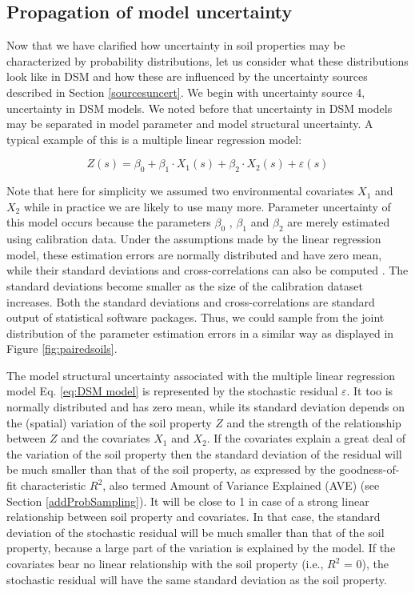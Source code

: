 \documentclass[10pt,b5paper,]{book}
\theoremstyle{definition}
\theoremstyle{definition}
\theoremstyle{definition}
\theoremstyle{remark}
\begin{document}
\hypertarget{propagation-of-model-uncertainty}{%
\subsection{Propagation of model
uncertainty}\label{propagation-of-model-uncertainty}}

Now that we have clarified how uncertainty in soil properties may be
characterized by probability distributions, let us consider what these
distributions look like in DSM and how these are influenced by the
uncertainty sources described in Section \ref{sourcesuncert}. We begin
with uncertainty source 4, uncertainty in DSM models. We noted before
that uncertainty in DSM models may be separated in model parameter and
model structural uncertainty. A typical example of this is a multiple
linear regression model:

\begin{equation}
\label{eq:DSM model}
Z(s) = \beta_0 + \beta_1  \cdot X_1 (s) + \beta_2 \cdot X_2 (s) + \varepsilon(s)
\end{equation}

Note that here for simplicity we assumed two environmental covariates
\({X_1}\) and \({X_2}\) while in practice we are likely to use many
more. Parameter uncertainty of this model occurs because the parameters
\({\beta_0}\) , \({\beta_1}\) and \({\beta_2}\) are merely estimated
using calibration data. Under the assumptions made by the linear
regression model, these estimation errors are normally distributed and
have zero mean, while their standard deviations and cross-correlations
can also be computed \citep[Section 17.5]{snedecor1989stadistical}. The
standard deviations become smaller as the size of the calibration
dataset increases. Both the standard deviations and cross-correlations
are standard output of statistical software packages. Thus, we could
sample from the joint distribution of the parameter estimation errors in
a similar way as displayed in Figure \ref{fig:pairedsoils}.

The model structural uncertainty associated with the multiple linear
regression model Eq. \ref{eq:DSM model} is represented by the stochastic
residual \({\varepsilon}\). It too is normally distributed and has zero
mean, while its standard deviation depends on the (spatial) variation of
the soil property \(Z\) and the strength of the relationship between
\(Z\) and the covariates \({X_1}\) and \({X_2}\). If the covariates
explain a great deal of the variation of the soil property then the
standard deviation of the residual will be much smaller than that of the
soil property, as expressed by the goodness-of-fit characteristic
\({R^2}\), also termed Amount of Variance Explained (AVE) (see Section
\ref{addProbSampling}). It will be close to 1 in case of a strong linear
relationship between soil property and covariates. In that case, the
standard deviation of the stochastic residual will be much smaller than
that of the soil property, because a large part of the variation is
explained by the model. If the covariates bear no linear relationship
with the soil property (i.e., \({R^2}\) = 0), the stochastic residual
will have the same standard deviation as the soil property.
\end{document}
